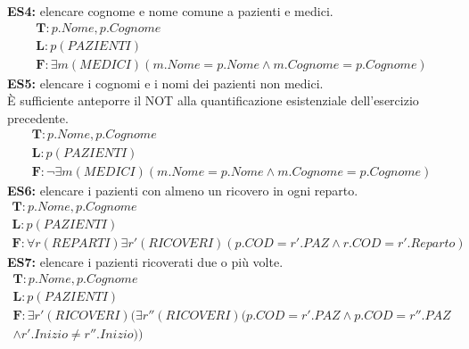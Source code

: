\textbf{ES4:} elencare cognome e nome comune a pazienti e medici.
    \begin{equation}\begin{aligned}
        \textbf{T}: p.Nome, p.Cognome\\
        \textbf{L}: p(PAZIENTI)\\
        \textbf{F}: \exists m(MEDICI)(m.Nome = p.Nome \wedge m.Cognome = p.Cognome)
    \end{aligned}\end{equation}
\textbf{ES5:} elencare i cognomi e i nomi dei pazienti non medici.\\
È sufficiente anteporre il NOT alla quantificazione esistenziale dell'esercizio precedente.
    \begin{equation}\begin{aligned}
        \textbf{T}: p.Nome, p.Cognome\\
        \textbf{L}: p(PAZIENTI)\\
        \textbf{F}: \neg\exists m(MEDICI)(m.Nome = p.Nome \wedge m.Cognome = p.Cognome)
    \end{aligned}\end{equation}
\textbf{ES6:} elencare i pazienti con almeno un ricovero in ogni reparto.
    \begin{equation}\begin{aligned}
        \textbf{T}: p.Nome, p.Cognome\\
        \textbf{L}: p(PAZIENTI)\\
        \textbf{F}: \forall r(REPARTI) \exists r'(RICOVERI)(p.COD = r'.PAZ \wedge r.COD = r'.Reparto)
    \end{aligned}\end{equation}
\textbf{ES7:} elencare i pazienti ricoverati due o più volte.
    \begin{equation}\begin{aligned}
        \textbf{T}: p.Nome, p.Cognome\\
        \textbf{L}: p(PAZIENTI)\\
        \textbf{F}: \exists r'(RICOVERI)(\exists r''(RICOVERI) (p.COD = r'.PAZ \wedge p.COD = r''.PAZ\\
        \wedge r'.Inizio \neq r''.Inizio))
    \end{aligned}\end{equation}
    
